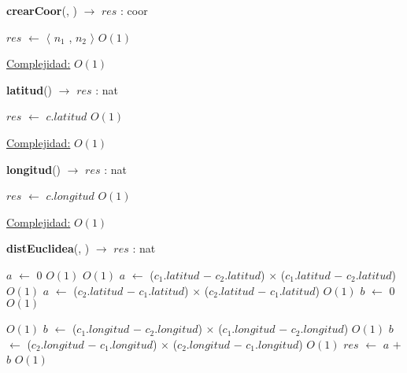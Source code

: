 \begin{Algoritmos}
   
\begin{algorithm}[H]{\textbf{crearCoor}(, ) $\to$ $res$ : coor}
\begin{algorithmic}[1]
	\State $res$ $\gets$  $\langle$ $n_1$ , $n_2$ $\rangle$ \Comment $O(1)$

	\medskip
	\Statex \underline{Complejidad:} $O(1)$
\end{algorithmic}
\end{algorithm}
   
\begin{algorithm}[H]{\textbf{latitud}() $\to$ $res$ : nat}
\begin{algorithmic}[1]
	\State $res$ $\gets$  $c$.$latitud$ \Comment $O(1)$

	\medskip
	\Statex \underline{Complejidad:} $O(1)$
			
\end{algorithmic}
\end{algorithm}


\begin{algorithm}[H]{\textbf{longitud}() $\to$ $res$ : nat}
\begin{algorithmic}[1]
	\State $res$ $\gets$  $c$.$longitud$ \Comment $O(1)$

	\medskip
	\Statex \underline{Complejidad:} $O(1)$
\end{algorithmic}
\end{algorithm}

\begin{algorithm}[H]{\textbf{distEuclidea}(, ) $\to$ $res$ : nat}
\begin{algorithmic}[1]
    \State $a$ $\gets$ $0$ \Comment $O(1)$
    	\Comment $O(1)$
		\State $a$ $\gets$ ($c_1$.$latitud$ $-$ $c_2$.$latitud$) $\times$ ($c_1$.$latitud$ $-$ $c_2$.$latitud$) \Comment $O(1)$	
	\Else 
		\State $a$ $\gets$ ($c_2$.$latitud$ $-$ $c_1$.$latitud$) $\times$ ($c_2$.$latitud$ $-$ $c_1$.$latitud$) \Comment $O(1)$	
	\EndIf
	\State $b$ $\gets$ $0$ \Comment $O(1)$

		\Comment $O(1)$
		\State $b$ $\gets$ ($c_1$.$longitud$ $-$ $c_2$.$longitud$) $\times$ ($c_1$.$longitud$ $-$ $c_2$.$longitud$)  \Comment $O(1)$	
	\Else 
		\State $b$ $\gets$ ($c_2$.$longitud$ $-$ $c_1$.$longitud$) $\times$ ($c_2$.$longitud$ $-$ $c_1$.$longitud$) \Comment $O(1)$	
	\EndIf
	\State $res$ $\gets$  $a$ $+$ $b$ \Comment $O(1)$


\end{algorithmic}
\end{algorithm}
\end{Algoritmos}
